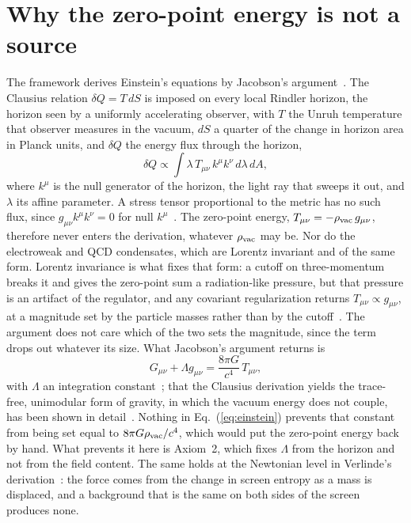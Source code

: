 \documentclass[aps,prd,twocolumn,superscriptaddress,nofootinbib,showkeys]{revtex4-2}
\begin{document}
\section{Why the zero-point energy is not a source}
\label{sec:decoupling}

The framework derives Einstein's equations by Jacobson's argument~\cite{jacobson1995}. The Clausius relation $\delta Q = T\,dS$ is imposed on every local Rindler horizon, the horizon seen by a uniformly accelerating observer, with $T$ the Unruh temperature that observer measures in the vacuum, $dS$ a quarter of the change in horizon area in Planck units, and $\delta Q$ the energy flux through the horizon,
\begin{equation}
\delta Q \propto \int \lambda\, T_{\mu\nu}\,k^\mu k^\nu\, d\lambda\, dA,
\label{eq:flux}
\end{equation}
where $k^\mu$ is the null generator of the horizon, the light ray that sweeps it out, and $\lambda$ its affine parameter. A stress tensor proportional to the metric has no such flux, since $g_{\mu\nu}k^\mu k^\nu = 0$ for null $k^\mu$~\cite{padmanabhan2006}. The zero-point energy, $T_{\mu\nu} = -\rho_{\rm vac}\,g_{\mu\nu}$, therefore never enters the derivation, whatever $\rho_{\rm vac}$ may be. Nor do the electroweak and QCD condensates, which are Lorentz invariant and of the same form. Lorentz invariance is what fixes that form: a cutoff on three-momentum breaks it and gives the zero-point sum a radiation-like pressure, but that pressure is an artifact of the regulator, and any covariant regularization returns $T_{\mu\nu}\propto g_{\mu\nu}$, at a magnitude set by the particle masses rather than by the cutoff~\cite{martin2012}. The argument does not care which of the two sets the magnitude, since the term drops out whatever its size. What Jacobson's argument returns is
\begin{equation}
G_{\mu\nu} + \Lambda g_{\mu\nu} = \frac{8\pi G}{c^4}\,T_{\mu\nu},
\label{eq:einstein}
\end{equation}
with $\Lambda$ an integration constant~\cite{jacobson1995,banks2018}; that the Clausius derivation yields the trace-free, unimodular form of gravity, in which the vacuum energy does not couple, has been shown in detail~\cite{alonsoserrano2020,alonsoserrano2022}. Nothing in Eq.~(\ref{eq:einstein}) prevents that constant from being set equal to $8\pi G\rho_{\rm vac}/c^4$, which would put the zero-point energy back by hand. What prevents it here is Axiom~2, which fixes $\Lambda$ from the horizon and not from the field content. The same holds at the Newtonian level in Verlinde's derivation~\cite{verlinde2011}: the force comes from the change in screen entropy as a mass is displaced, and a background that is the same on both sides of the screen produces none.
\end{document}
